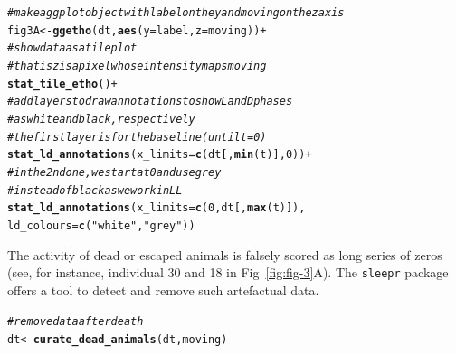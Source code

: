 \documentclass[10pt,letterpaper]{article}\usepackage[]{graphicx}\usepackage[]{color}
\makeatletter
\newcommand{\hlnum}[1]{\textcolor[rgb]{0.686,0.059,0.569}{#1}}%
\newcommand{\hlstr}[1]{\textcolor[rgb]{0.192,0.494,0.8}{#1}}%
\newcommand{\hlcom}[1]{\textcolor[rgb]{0.678,0.584,0.686}{\textit{#1}}}%
\newcommand{\hlopt}[1]{\textcolor[rgb]{0,0,0}{#1}}%
\newcommand{\hlstd}[1]{\textcolor[rgb]{0.345,0.345,0.345}{#1}}%
\newcommand{\hlkwb}[1]{\textcolor[rgb]{0.69,0.353,0.396}{#1}}%
\newcommand{\hlkwc}[1]{\textcolor[rgb]{0.333,0.667,0.333}{#1}}%
\newcommand{\hlkwd}[1]{\textcolor[rgb]{0.737,0.353,0.396}{\textbf{#1}}}%
\newenvironment{kframe}{%
 \def\at@end@of@kframe{}%
 \ifinner\ifhmode%
  \def\at@end@of@kframe{\end{minipage}}%
  \begin{minipage}{\columnwidth}%
 \fi\fi%
 \def\FrameCommand##1{\hskip\@totalleftmargin \hskip-\fboxsep
 \colorbox{shadecolor}{##1}\hskip-\fboxsep
     \hskip-\linewidth \hskip-\@totalleftmargin \hskip\columnwidth}%
 \MakeFramed {\advance\hsize-\width
   \@totalleftmargin\z@ \linewidth\hsize
   \@setminipage}}%
 {\par\unskip\endMakeFramed%
 \at@end@of@kframe}
\newenvironment{knitrout}{}{} %
\makeatother
\begin{document}
\begin{knitrout}
\color{fgcolor}\begin{kframe}
\begin{alltt}
\hlcom{# make a ggplot object with label on the y and moving on the z axis}
\hlstd{fig3A} \hlkwb{<-} \hlkwd{ggetho}\hlstd{(dt,} \hlkwd{aes}\hlstd{(}\hlkwc{y} \hlstd{= label,} \hlkwc{z} \hlstd{= moving))} \hlopt{+}
  \hlcom{# show data as a tile plot}
  \hlcom{# that is z is a pixel whose intensity maps moving}
  \hlkwd{stat_tile_etho}\hlstd{()} \hlopt{+}
  \hlcom{# add layers to draw annotations to show L and D phases}
  \hlcom{# as white and black, respectively}
  \hlcom{# the first layer is for the baseline (until t = 0)}
  \hlkwd{stat_ld_annotations}\hlstd{(}\hlkwc{x_limits} \hlstd{=} \hlkwd{c}\hlstd{(dt[,}\hlkwd{min}\hlstd{(t)],} \hlnum{0}\hlstd{))} \hlopt{+}
  \hlcom{# in the 2nd one, we start at 0 and use grey }
  \hlcom{# instead of black as we work in LL}
  \hlkwd{stat_ld_annotations}\hlstd{(}\hlkwc{x_limits} \hlstd{=} \hlkwd{c}\hlstd{(}\hlnum{0}\hlstd{, dt[,} \hlkwd{max}\hlstd{(t)]),}
                      \hlkwc{ld_colours} \hlstd{=} \hlkwd{c}\hlstd{(}\hlstr{"white"}\hlstd{,} \hlstr{"grey"}\hlstd{))}
\end{alltt}
\end{kframe}
\end{knitrout}


The activity of dead or escaped animals is falsely scored as long series of zeros (see, for instance, individual 30 and 18 in Fig~\ref{fig:fig-3}A).
The \texttt{sleepr} package offers a tool to detect and remove such artefactual data.

\begin{knitrout}
\color{fgcolor}\begin{kframe}
\begin{alltt}
\hlcom{# remove data after death}
\hlstd{dt} \hlkwb{<-} \hlkwd{curate_dead_animals}\hlstd{(dt, moving)}
\end{alltt}
\end{kframe}
\end{knitrout}
\end{document}
